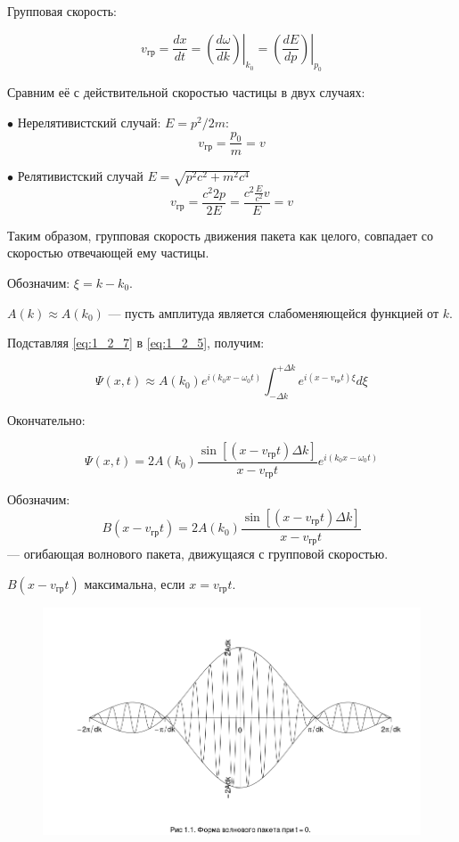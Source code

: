 Групповая скорость:

\begin{equation}
\label{eq:1_2_7}
v_{\text{гр}} = \frac{dx}{dt} = \left . \left ( \frac{d\omega}{dk} \right ) \right |_{k_0} = \left . \left ( \frac{dE}{dp} \right ) \right |_{p_0}
\end{equation}

Сравним её с действительной скоростью частицы в двух случаях:

$\bullet$ Нерелятивистский случай: $E = p^2/{2m}$:
$$v_{\text{гр}} = \frac{p_0}{m} = v$$

$\bullet$ Релятивистский случай $E = \sqrt{p^2c^2 + m^2c^4}$
$$v_{\text{гр}} = \frac{c^2 2p}{2E} = \frac{c^2 \frac{E}{c^2}v}{E} = v$$

Таким образом, групповая скорость движения пакета как целого, совпадает со скоростью отвечающей ему частицы. 

Обозначим: $\xi = k - k_0$.

$A(k) \approx A(k_0)$ --- пусть амплитуда является слабоменяющейся функцией от $k$.

Подставляя \eqref{eq:1_2_7} в \eqref{eq:1_2_5}, получим:

$$\Psi(x,t) \approx A(k_0) e^{i(k_0 x - \omega_0 t) }\int^{+ \Delta k}_{ - \Delta k} e^{i(x - v_{\text{гр}}t)\xi} d\xi$$

Окончательно:

\begin{equation}
\label{eq:1_2_8}
\Psi(x,t) = 2 A(k_0) \frac{\sin [(x - v_{\text{гр}}t)\Delta k]}{x - v_{\text{гр}}t}e^{i(k_0 x - \omega_0 t)}
\end{equation}

Обозначим:
$$B(x - v_{\text{гр}}t) =  2 A(k_0) \frac{\sin [(x - v_{\text{гр}}t)\Delta k]}{x - v_{\text{гр}}t}$$ --- огибающая волнового пакета, движущаяся с групповой скоростью.

$B(x - v_{\text{гр}}t)$ максимальна, если $x = v_{\text{гр}}t$.

\begin{figure}[here]
  \centering
  \includegraphics[scale=0.4]{figs/1_1.png}
  \label{fig:1_1}
\end{figure}

